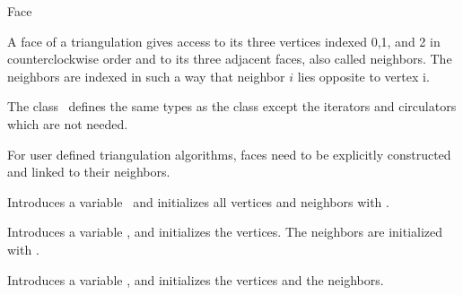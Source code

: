 

\begin{ccRefClass}{Face}  %


\ccDefinition
  
A face of a triangulation gives access to its three
vertices indexed 0,1, and 2 in counterclockwise order
and to its three adjacent faces, also called neighbors.
The neighbors are indexed in such a way that neighbor $i$ lies
opposite to vertex i. 




\ccTypes
The class  \ccRefName\  defines the same types 
as the class  except the iterators and circulators
which are not needed.

\begin{ccAdvanced}
\ccCreation

For user defined triangulation algorithms, faces need to
be explicitly constructed and linked to their neighbors.

{Introduces a variable \ccVar\ and initializes all vertices and neighbors 
 with .}

{Introduces a variable \ccVar, and initializes the vertices. The 
neighbors are initialized with .}

{Introduces a variable \ccVar, and initializes the vertices and the neighbors.}




\end{ccAdvanced}
\end{ccRefClass}
